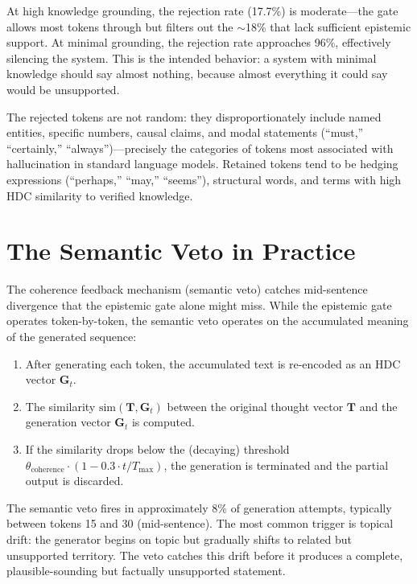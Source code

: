 \documentclass[12pt]{book}
\begin{document}
At high knowledge grounding, the rejection rate (17.7\%) is moderate---the gate allows most tokens through but filters out the $\sim$18\% that lack sufficient epistemic support. At minimal grounding, the rejection rate approaches 96\%, effectively silencing the system. This is the intended behavior: a system with minimal knowledge should say almost nothing, because almost everything it could say would be unsupported.

The rejected tokens are not random: they disproportionately include named entities, specific numbers, causal claims, and modal statements (``must,'' ``certainly,'' ``always'')---precisely the categories of tokens most associated with hallucination in standard language models. Retained tokens tend to be hedging expressions (``perhaps,'' ``may,'' ``seems''), structural words, and terms with high HDC similarity to verified knowledge.

\section{The Semantic Veto in Practice}

The coherence feedback mechanism (semantic veto) catches mid-sentence divergence that the epistemic gate alone might miss. While the epistemic gate operates token-by-token, the semantic veto operates on the accumulated meaning of the generated sequence:

\begin{enumerate}
  \item After generating each token, the accumulated text is re-encoded as an HDC vector $\mathbf{G}_t$.
  \item The similarity $\text{sim}(\mathbf{T}, \mathbf{G}_t)$ between the original thought vector $\mathbf{T}$ and the generation vector $\mathbf{G}_t$ is computed.
  \item If the similarity drops below the (decaying) threshold $\theta_{\text{coherence}} \cdot (1 - 0.3 \cdot t/T_{\text{max}})$, the generation is terminated and the partial output is discarded.
\end{enumerate}

The semantic veto fires in approximately 8\% of generation attempts, typically between tokens 15 and 30 (mid-sentence). The most common trigger is topical drift: the generator begins on topic but gradually shifts to related but unsupported territory. The veto catches this drift before it produces a complete, plausible-sounding but factually unsupported statement.
\end{document}
